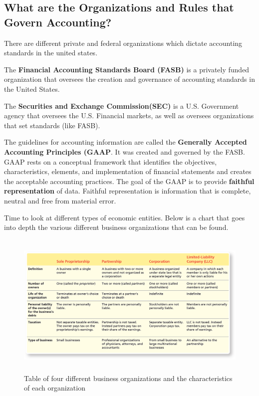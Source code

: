 \documentclass[a4paper, 12pt]{article}
\begin{document}
\subsection{What are the Organizations and Rules that Govern Accounting?}
There are different private and federal organizations which dictate accounting
standards in the united states.

The \textbf{Financial Accounting Standards Board (FASB)} is a privately funded
organization that oversees the creation and governance of accounting standards
in the United States.

The \textbf{Securities and Exchange Commission(SEC)} is a U.S. Government agency
that oversees the U.S. Financial markets, as well as oversees organizations that
set standards (like FASB).

The guidelines for accounting information are called the \textbf{Generally Accepted
Accounting Principles (GAAP}. It was created and governed by the FASB. GAAP rests
on a conceptual framework that identifies the objectives, characteristics,
elements, and implementation of financial statements and creates the acceptable
accounting practices. The goal of the GAAP is to provide \textbf{faithful
representation} of data. Faithful representation is information that is complete,
neutral and free from material error.

Time to look at different types of economic entities. Below is a chart that
goes into depth the various different business organizations that can be found.

\begin{figure}[h]
    \centering
    \includegraphics[width=13.0cm, height=7cm]{business_organizations.png}
    \caption{Table of four different business organizations and the characteristics
    of each organization}
    \label{fig:bus_org1}
\end{figure}
\end{document}
